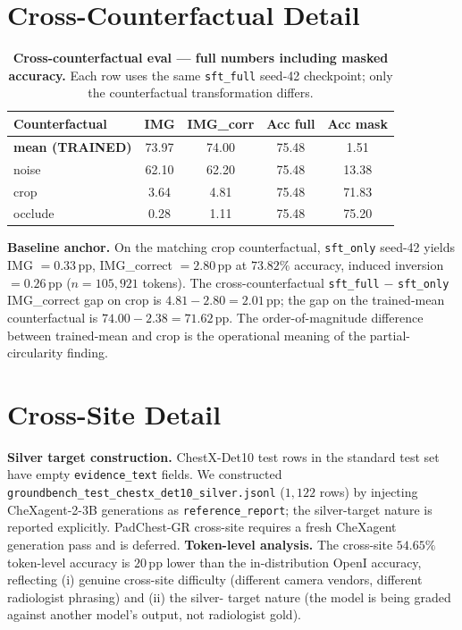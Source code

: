 \documentclass{article}
\begin{document}
\section{Cross-Counterfactual Detail}
\label{app:cross-cf}

\begin{table}[t]
\centering
\small
\caption{\textbf{Cross-counterfactual eval --- full numbers including
masked accuracy.} Each row uses the same \texttt{sft\_full} seed-42
checkpoint; only the counterfactual transformation differs.}
\label{tab:cross-cf-full}
\setlength{\tabcolsep}{3.0pt}
\begin{tabular}{lcccc}
\toprule
\textbf{Counterfactual} & \textbf{IMG} & \textbf{IMG\_corr} & \textbf{Acc full} & \textbf{Acc mask}\\
\midrule
\textbf{mean (TRAINED)} & 73.97 & 74.00 & 75.48 & \phantom{0}1.51\\
noise                   & 62.10 & 62.20 & 75.48 & 13.38\\
crop                    & \phantom{0}3.64 & \phantom{0}4.81 & 75.48 & 71.83\\
occlude                 & \phantom{0}0.28 & \phantom{0}1.11 & 75.48 & 75.20\\
\bottomrule
\end{tabular}
\end{table}

\textbf{Baseline anchor.} On the matching crop counterfactual,
\texttt{sft\_only} seed-42 yields IMG $= 0.33$\,pp, IMG\_correct
$= 2.80$\,pp at $73.82\%$ accuracy, induced inversion $= 0.26$\,pp
($n = 105{,}921$ tokens). The cross-counterfactual \texttt{sft\_full}
$-$ \texttt{sft\_only} IMG\_correct gap on crop is
$4.81 - 2.80 = 2.01$\,pp; the gap on the trained-mean counterfactual is
$74.00 - 2.38 = 71.62$\,pp. The order-of-magnitude difference between
trained-mean and crop is the operational meaning of the partial-
circularity finding.

\section{Cross-Site Detail}
\label{app:crosssite}

\textbf{Silver target construction.} ChestX-Det10 test rows in the
standard test set have empty \texttt{evidence\_text} fields. We
constructed \texttt{groundbench\_test\_chestx\_det10\_silver.jsonl}
($1{,}122$ rows) by injecting CheXagent-2-3B
\citep{chen2024chexagent} generations as \texttt{reference\_report};
the silver-target nature is reported explicitly. PadChest-GR cross-site
\citep{castro2024padchestgr} requires a fresh CheXagent generation pass
and is deferred. \textbf{Token-level analysis.} The cross-site $54.65\%$
token-level accuracy is $20$\,pp lower than the in-distribution OpenI
accuracy, reflecting (i) genuine cross-site difficulty (different
camera vendors, different radiologist phrasing) and (ii) the silver-
target nature (the model is being graded against another model's
output, not radiologist gold).
\end{document}
